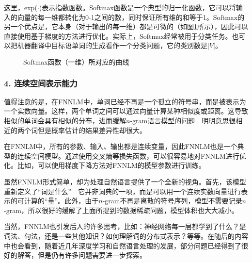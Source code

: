 \noindent 这里，exp($\cdot$)表示指数函数。Softmax函数是一个典型的归一化函数，它可以将输入的向量的每一维都转化为0-1之间的数，同时保证所有维的和等于1。Softmax的另一个优点是，它本身（对于输出的每一维）都是可微的（如图\ref{fig:softmax}所示），因此可以直接使用基于梯度的方法进行优化。实际上，Softmax经常被用于分类任务。也可以把机器翻译中目标语单词的生成看作一个分类问题，它的类别数是|$V$|。

\begin{figure}[htp]
\centering

\caption{ Softmax函数（一维）所对应的曲线}
\label{fig:softmax}
\end{figure}


\subsubsection{4. 连续空间表示能力}

\parinterval  值得注意的是，在FNNLM中，单词已经不再是一个孤立的符号串，而是被表示为一个实数向量。这样，两个单词之间可以通过向量计算某种相似度或距离。这导致相似的单词会具有相似的分布，进而缓解$n$-gram语言模型的问题\ \dash \ 明明意思很相近的两个词但是概率估计的结果差异性却很大。

\parinterval  在FNNLM中，所有的参数、输入、输出都是连续变量，因此FNNLM也是一个典型的连续空间模型。通过使用交叉熵等损失函数，可以很容易地对FNNLM进行优化。比如，可以使用梯度下降方法对FNNLM的模型参数进行训练。

\parinterval  虽然FNNLM形式简单，却为处理自然语言提供了一个全新的视角。首先，该模型重新定义了“词是什么”\ \dash \ 它并非词典的一项，而是可以用一个连续实数向量进行表示的可计算的“量”。此外，由于$n$-gram不再是离散的符号序列，模型不需要记录$n$-gram，所以很好的缓解了上面所提到的数据稀疏问题，模型体积也大大减小。

\parinterval  当然，FNNLM也引发后人的许多思考，比如：神经网络每一层都学到了什么？是词法、句法，还是一些其他知识？如何理解词的分布式表示？等等。在随后的内容中也会看到，随着近几年深度学习和自然语言处理的发展，部分问题已经得到了很好的解答，但是仍有许多问题需要进一步探索。


